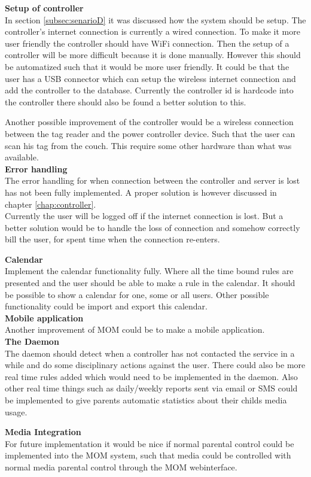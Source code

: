 \textbf{Setup of controller}\\
In section \vref{subsec:senarioD} it was discussed how the system should be setup. The controller's internet connection is currently a wired connection. To make it more user friendly the controller should have WiFi connection. Then the setup of a controller will be more difficult because it is done manually. However this should be automatized such that it would be more user friendly. It could be that the user has a USB connector which can setup the wireless internet connection and add the controller to the database. Currently the controller id is hardcode into the controller there should also be found a better solution to this. 

Another possible improvement of the controller would be a wireless connection between the tag reader and the power controller device. Such that the user can scan his tag from the couch. This require some other hardware than what was available.\\

\textbf{Error handling}\\
The error handling for when connection between the controller and server is lost has not been fully implemented. A proper solution is however discussed in chapter \vref{chap:controller}.\\
Currently the user will be logged off if the internet connection is lost. But a better solution would be to handle the loss of connection and somehow correctly bill the user, for spent time when the connection re-enters.

\textbf{Calendar}\\
Implement the calendar functionality fully. Where all the time bound rules are presented and the user should be able to make a rule in the calendar. It should be possible to show a calendar for one, some or all users. Other possible functionality could be import and export this calendar.\\

\textbf{Mobile application}\\
Another improvement of MOM could be to make a mobile application.\\

\textbf{The Daemon}\\
The daemon should detect when a controller has not contacted the service in a while and do some disciplinary actions against the user. There could also be more real time rules added which would need to be implemented in the daemon. Also other real time things such as daily/weekly reports sent via email or SMS could be implemented to give parents automatic statistics about their childs media usage. 

\textbf{Media Integration}\\
For future implementation it would be nice if normal parental control could be implemented into the MOM system, such that media could be controlled with normal media parental control through the MOM webinterface.